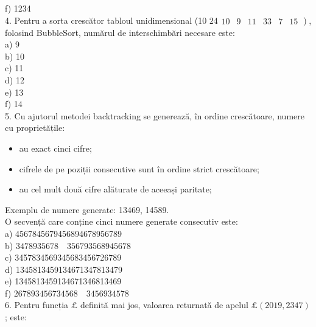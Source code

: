 f) 1234\\
4. Pentru a sorta crescător tabloul unidimensional (10 $\left.24 \begin{array}{llllll}10 & 9 & 11 & 33 & 7 & 15\end{array}\right)$, folosind BubbleSort, numărul de interschimbări necesare este:\\
a) 9\\
b) 10\\
c) 11\\
d) 12\\
e) 13\\
f) 14\\
5. Cu ajutorul metodei backtracking se generează, în ordine crescătoare, numere cu proprietățile:

\begin{itemize}
  \item au exact cinci cifre;
  \item cifrele de pe poziții consecutive sunt în ordine strict crescătoare;
  \item au cel mult două cifre alăturate de aceeași paritate;
\end{itemize}

Exemplu de numere generate: 13469, 14589.\\
O secvență care conține cinci numere generate consecutiv este:\\
a) 4567845679456894678956789\\
b) $3478935678 \quad 356793568945678$\\
c) 3457834569345683456726789\\
d) 1345813459134671347813479\\
e) 1345813459134671346813469\\
f) $267893456734568 \quad 3456934578$\\
6. Pentru funcția $\pounds$ definită mai jos, valoarea returnată de apelul $\pounds(2019,2347)$; este:

